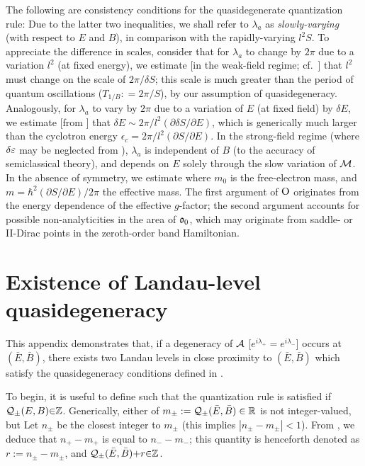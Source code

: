 \documentclass[aps, prb, showpacs, twocolumn, notitlepage, superscriptaddress]{revtex4-1}
\begin{document}
The following are consistency conditions for the quasidegenerate quantization rule:
Due to the latter two inequalities, we shall refer to $\lambda_{a}$ as \textit{slowly-varying} (with respect to $E$ and $B$), in comparison with the rapidly-varying $l^2S$. To appreciate the difference in scales, consider that for $\lambda_a$ to change by $2\pi$ due to a variation $l^2$ (at fixed energy), we estimate [in the weak-field regime; cf.\ ] that $l^2$ must change on the scale of $2\pi/\delta S$; this scale is much greater than the period of quantum oscillations ($T_{1/B}{:}{=}2\pi/ S$), by our assumption of quasidegeneracy. Analogously, for $\lambda_a$ to vary by $2\pi$ due to a variation of $E$ (at fixed field) by $\delta E$, we estimate [from ] that $\delta E {\sim} 2\pi/l^2 (\partial \delta S/\partial E)$, which is generically much larger than the cyclotron energy $\epsilon_c{=}2\pi/l^2 (\partial  S/\partial E)$. In the strong-field regime (where $\delta \varepsilon$ may be neglected from ), $\lambda_a$ is independent of $B$ (to the accuracy of semiclassical theory), and depends on $E$ solely through the slow variation of ${\cal M}$.  In the absence of symmetry, we estimate 
where $m_0$ is the free-electron mass, and $m{=}\hbar^2(\partial S/\partial E)/2\pi$ the effective mass. The first argument of $\text{O}$ originates from the energy dependence of the effective $g$-factor; the second argument accounts for possible non-analyticities in the area of $\mathfrak{o}_0$, which may originate from saddle- or II-Dirac points in the zeroth-order band Hamiltonian.

\section{Existence of Landau-level quasidegeneracy}\label{sec:proofLLquasideg}

This appendix demonstrates that, if a degeneracy of ${\cal A}$ [$e^{i\lambda_+}{=}e^{i\lambda_-}$] occurs at $(\bar{E},\bar{B})$, there exists two Landau levels in close proximity to $(\bar{E},\bar{B})$ which satisfy the quasidegeneracy conditions defined in .

To begin, it is useful to define
such that the quantization rule  is satisfied if ${\cal Q}_{\pm}(E,B){\in}\mathbb{Z}$. 
Generically, either of $m_{\pm}:={\cal Q}_{\pm}(\bar{E},\bar{B})\in \mathbb{R}$ is not integer-valued, but 
Let $n_{\pm}$ be the closest integer to $m_{\pm}$ (this implies $|n_{\pm}-m_{\pm}|<1$).  From , we deduce that $n_+-m_+$ is equal to $n_--m_-$; this quantity is henceforth denoted as $r:= n_{\pm}-m_{\pm}$, and  ${\cal Q}_{\pm}(\bar{E},\bar{B}){+}r{\in} \mathbb{Z}$. 
\end{document}
